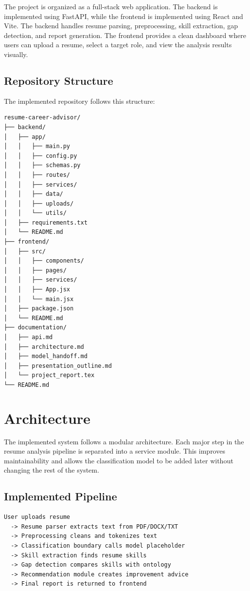 \documentclass[12pt,a4paper]{article}
\begin{document}
The project is organized as a full-stack web application. The backend is implemented using FastAPI, while the frontend is implemented using React and Vite. The backend handles resume parsing, preprocessing, skill extraction, gap detection, and report generation. The frontend provides a clean dashboard where users can upload a resume, select a target role, and view the analysis results visually.

\subsection{Repository Structure}

The implemented repository follows this structure:

\begin{lstlisting}
resume-career-advisor/
├── backend/
│   ├── app/
│   │   ├── main.py
│   │   ├── config.py
│   │   ├── schemas.py
│   │   ├── routes/
│   │   ├── services/
│   │   ├── data/
│   │   ├── uploads/
│   │   └── utils/
│   ├── requirements.txt
│   └── README.md
├── frontend/
│   ├── src/
│   │   ├── components/
│   │   ├── pages/
│   │   ├── services/
│   │   ├── App.jsx
│   │   └── main.jsx
│   ├── package.json
│   └── README.md
├── documentation/
│   ├── api.md
│   ├── architecture.md
│   ├── model_handoff.md
│   ├── presentation_outline.md
│   └── project_report.tex
└── README.md
\end{lstlisting}

\section{Architecture}

The implemented system follows a modular architecture. Each major step in the resume analysis pipeline is separated into a service module. This improves maintainability and allows the classification model to be added later without changing the rest of the system.

\subsection{Implemented Pipeline}

\begin{lstlisting}
User uploads resume
  -> Resume parser extracts text from PDF/DOCX/TXT
  -> Preprocessing cleans and tokenizes text
  -> Classification boundary calls model placeholder
  -> Skill extraction finds resume skills
  -> Gap detection compares skills with ontology
  -> Recommendation module creates improvement advice
  -> Final report is returned to frontend
\end{lstlisting}
\end{document}
